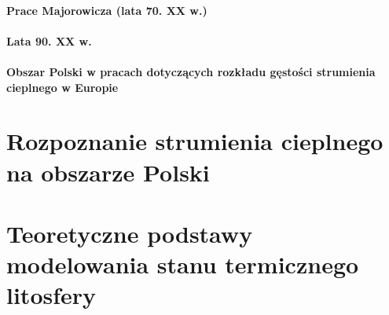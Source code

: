 \documentclass[11.5pt,twoside]{report}
\begin{document}
\subsubsection{Prace Majorowicza (lata 70. XX w.)}

\subsubsection{Lata 90. XX w.}

\subsubsection{Obszar Polski w pracach dotyczących rozkładu gęstości strumienia cieplnego w Europie}

\chapter{Rozpoznanie strumienia cieplnego na obszarze Polski}

\chapter{Teoretyczne podstawy modelowania stanu termicznego litosfery}
\end{document}
